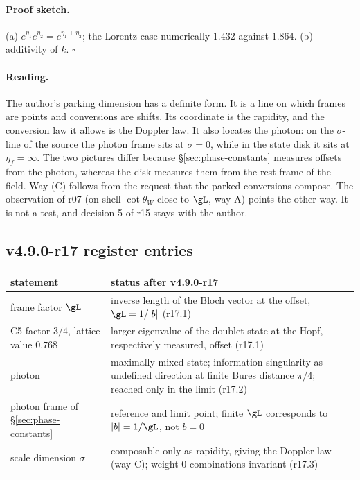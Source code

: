 \paragraph{Proof sketch.}
(a) \(e^{\eta_1}e^{\eta_2}=e^{\eta_1+\eta_2}\); the Lorentz case numerically \(1.432\) against \(1.864\).  (b) additivity of \(k\).  \(\square\)

\paragraph{Reading.}
The author's parking dimension has a definite form.  It is a line on which frames are points and conversions are shifts.
Its coordinate is the rapidity, and the conversion law it allows is the Doppler law.  It also locates the photon: on the
\(\sigma\)-line of the source the photon frame sits at \(\sigma=0\), while in the state disk it sits at \(\eta_f=\infty\).  The two
pictures differ because \S\ref{sec:phase-constants} measures offsets from the photon, whereas the disk measures them from the
rest frame of the field.  Way (C) follows from the request that the parked conversions compose.  The observation of r07
(on-shell \(\cot\theta_W\) close to \(\gL\), way A) points the other way.  It is not a test, and decision 5 of r15 stays with
the author.

\subsection*{v4.9.0-r17 register entries}
\label{subsec:v490-r17-register}

\begin{center}
\small
\begin{tabular}{@{}>{\raggedright\arraybackslash}p{}>{\raggedright\arraybackslash}p{}@{}}
\toprule
statement & status after v4.9.0-r17\\
\midrule
frame factor \(\gL\) & inverse length of the Bloch vector at the offset, \(\gL=1/|b|\) (r17.1)\\
C5 factor \(3/4\), lattice value \(0.768\) & larger eigenvalue of the doublet state at the Hopf, respectively measured, offset (r17.1)\\
photon & maximally mixed state; information singularity as undefined direction at finite Bures distance \(\pi/4\); reached only in the limit (r17.2)\\
photon frame of \S\ref{sec:phase-constants} & reference and limit point; finite \(\gL\) corresponds to \(|b|=1/\gL\), not \(b=0\)\\
scale dimension \(\sigma\) & composable only as rapidity, giving the Doppler law (way C); weight-0 combinations invariant (r17.3)\\
\bottomrule
\end{tabular}
\end{center}

